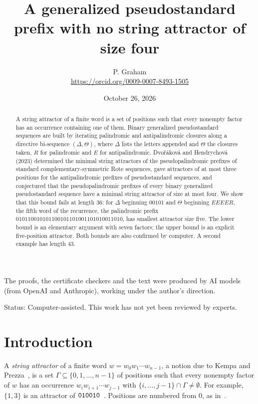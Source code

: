 \documentclass[11pt]{article}
\title{A generalized pseudostandard prefix with no string attractor of size four}
\author{P. Graham\\ \small\url{https://orcid.org/0009-0007-8493-1505}}
\date{October 26, 2026}
\theoremstyle{remark}
\newcommand{\w}[1]{\textup{\texttt{#1}}}
\begin{document}
\maketitle
\begin{abstract}
A string attractor of a finite word is a set of positions such that every
nonempty factor has an occurrence containing one of them. Binary generalized
pseudostandard sequences are built by iterating palindromic and
antipalindromic closures along a directive bi-sequence $(\Delta,\Theta)$, where
$\Delta$ lists the letters appended and $\Theta$ the closures taken, $R$ for
palindromic and $E$ for antipalindromic.
Dvořáková and Hendrychová (2023) determined the minimal string attractors of
the pseudopalindromic prefixes of standard complementary-symmetric Rote
sequences, gave attractors of at most three positions for the
antipalindromic prefixes of pseudostandard sequences, and conjectured that the
pseudopalindromic prefixes of every binary generalized pseudostandard
sequence have a minimal string attractor of size at most four. We show that
this bound fails at length 36: for $\Delta$ beginning $00101$ and $\Theta$
beginning $EEEER$, the fifth word of the recurrence, the palindromic prefix
$010110010101100101101001101010011010$, has smallest attractor size five.
The lower bound is an elementary argument with seven factors; the upper bound
is an explicit five-position attractor. Both bounds are also confirmed by
computer. A second example has length 43.
\end{abstract}

\noindent The proofs, the certificate checkers and the text were produced by AI models (from OpenAI and Anthropic), working under the author's direction.

\medskip\noindent Status: Computer-assisted. This work has not yet been reviewed by experts.

\section{Introduction}

A \emph{string attractor} of a finite word $w=w_0w_1\cdots w_{n-1}$, a notion
due to Kempa and Prezza~\cite{kp}, is a set $\Gamma\subseteq\{0,1,\dots,n-1\}$
of positions such that every nonempty factor of $w$ has an occurrence
$w_iw_{i+1}\cdots w_{j-1}$ with $\{i,\dots,j-1\}\cap\Gamma\neq\emptyset$. For
example, $\{1,3\}$ is an attractor of $\w{010010}$~\cite[Section~2]{dh}.
Positions are numbered from $0$, as in~\cite{dh}.
\end{document}
